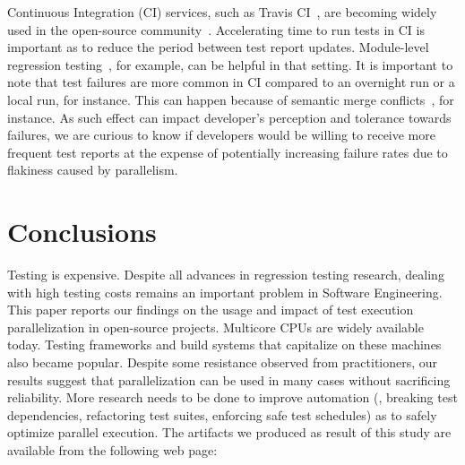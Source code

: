 \documentclass[10pt,journal,compsoc]{IEEEtran}
\begin{document}
Continuous Integration (CI) services, such as Travis CI~\cite{travis},
are becoming widely used in the open-source
community~\cite{hilton-etal-ase2016,vasilescu-etal-fse2015}. Accelerating
time to run tests in CI is important as to reduce the period between
test report updates.  Module-level regression
testing~\cite{vasic-etal-fse2017}, for example, can be helpful in that
setting. It is important to note that test failures are more common in
CI compared to an overnight run or a local run, for instance.  This
can happen because of semantic merge conflicts~\cite{brun-etal-fse11},
for instance.  As such effect can impact developer's perception and
tolerance towards failures, we are curious to know if developers would
be willing to receive more frequent test reports at the expense of
potentially increasing failure rates due to flakiness caused by
parallelism.


\section{Conclusions}

Testing is expensive.  Despite all advances in regression testing
research, dealing with high testing costs remains an important problem
in Software Engineering.  This paper reports our findings on the usage
and impact of test execution parallelization in open-source projects.
Multicore CPUs are widely available today.  Testing frameworks and
build systems that capitalize on these machines also became popular.
Despite some resistance observed from practitioners, our results
suggest that parallelization can be used in many cases without
sacrificing reliability. More research needs to be done to improve
automation (\eg{}, breaking test dependencies, refactoring test
suites, enforcing safe test schedules) as to safely optimize parallel
execution.  The artifacts we produced as result of this study are
available from the following web page:

\begin{center}
  \webpage{}
\end{center}  


\end{document}
